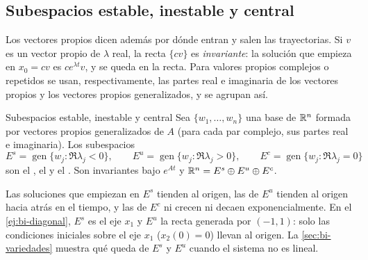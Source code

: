 \subsection{Subespacios estable, inestable y central}

Los vectores propios dicen además por dónde entran y salen las trayectorias. Si $v$ es un vector propio de $\lambda$ real, la recta $\{cv\}$ es \emph{invariante}: la solución que empieza en $x_0=cv$ es $ce^{\lambda t}v$, y se queda en la recta. Para valores propios complejos o repetidos se usan, respectivamente, las partes real e imaginaria de los vectores propios y los vectores propios generalizados, y se agrupan así.

\begin{definicion}[label=def:bi-subespacios]{Subespacios estable, inestable y central \citep[\S1.9]{Per01}}
Sea $\{w_1,\dots,w_n\}$ una base de $\mathbb{R}^n$ formada por vectores propios generalizados de $A$ (para cada par complejo, sus partes real e imaginaria). Los subespacios
\[
  E^s=\operatorname{gen}\{w_j:\Re\lambda_j<0\},\qquad E^u=\operatorname{gen}\{w_j:\Re\lambda_j>0\},\qquad E^c=\operatorname{gen}\{w_j:\Re\lambda_j=0\}
\]
son el , el  y el . Son invariantes bajo $e^{At}$ y $\mathbb{R}^n=E^s\oplus E^u\oplus E^c$.
\end{definicion}

Las soluciones que empiezan en $E^s$ tienden al origen, las de $E^u$ tienden al origen hacia atrás en el tiempo, y las de $E^c$ ni crecen ni decaen exponencialmente. En el \cref{ej:bi-diagonal}, $E^s$ es el eje $x_1$ y $E^u$ la recta generada por $(-1,1)$: solo las condiciones iniciales sobre el eje $x_1$ ($x_2(0)=0$) llevan al origen. La \cref{sec:bi-variedades} muestra qué queda de $E^s$ y $E^u$ cuando el sistema no es lineal.
